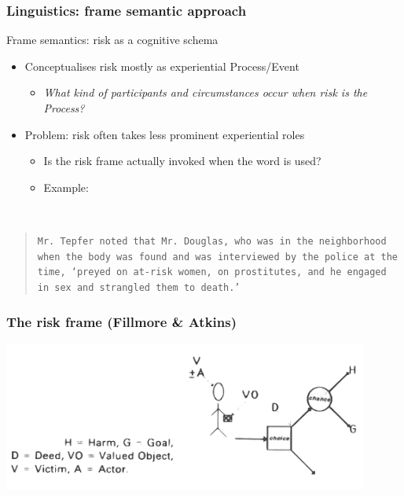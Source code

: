 \documentclass{beamer}       %
\begin{document}
\begin{frame}
    \frametitle{Linguistics: frame semantic approach}

    Frame semantics: risk as a cognitive schema \cite{fillmore_toward_1992}

\begin{itemize}
    \item Conceptualises risk mostly as experiential Process\slash Event
    \begin{itemize}
        \item \emph{What kind of participants and circumstances occur when risk is the Process?}
    \end{itemize}
    \item Problem: risk often takes less prominent experiential roles
    \begin{itemize}
        \item Is the risk frame actually invoked when the word is used?
        \item Example:
    \end{itemize}
    \end{itemize}

    ~\\
    \footnotesize
    \begin{quote}
    \noindent
    \texttt{Mr. Tepfer noted that Mr. Douglas, who was in the neighborhood when the body was found and was interviewed by the police at the time, `preyed on \textbf{at-risk women}, on prostitutes, and he engaged in sex and strangled them to death.' }
    \end{quote}

\end{frame}

\begin{frame}
    \frametitle{The risk frame (Fillmore \& Atkins)}
    \centering
    \includegraphics[width=0.90\textwidth]{../../images/riskframe.png}
\end{frame}
\end{document}
